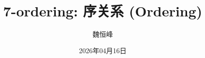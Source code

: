 \documentclass[]{beamer}
\title[7-ordering: 序关系]{7-ordering: 序关系 (Ordering)}
\author[魏恒峰]{\large 魏恒峰}
\institute{hfwei@hnu.edu.cn}
\date{2026年04月16日}
\begin{document}
\maketitle










\thankyou{}

\end{document}
